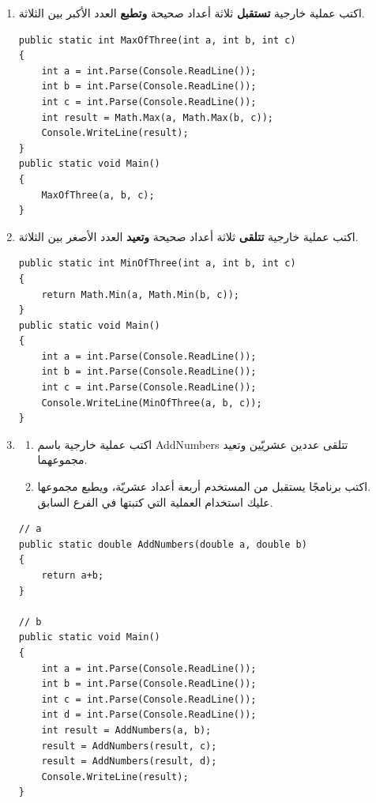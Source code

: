 ﻿\documentclass[12pt]{article}
\begin{document}
\begin{enumerate}[itemsep=3em]
\begin{enumerate}
\item اكتب عملية خارجية \textbf{تستقبل} ثلاثة أعداد صحيحة \textbf{وتطبع} العدد الأكبر بين الثلاثة.
\ifwithsols
\begin{boxSolution}
\begin{english}
\begin{verbatim}
public static int MaxOfThree(int a, int b, int c)
{
    int a = int.Parse(Console.ReadLine());
    int b = int.Parse(Console.ReadLine());
    int c = int.Parse(Console.ReadLine());
    int result = Math.Max(a, Math.Max(b, c));
    Console.WriteLine(result);
}
public static void Main()
{
    MaxOfThree(a, b, c);
}
\end{verbatim}
\end{english}
\end{boxSolution}
\clearpage
\fi


\item اكتب عملية خارجية \textbf{تتلقى} ثلاثة أعداد صحيحة \textbf{وتعيد} العدد الأصغر بين الثلاثة.
\ifwithsols
\begin{boxSolution}
\begin{english}
\begin{verbatim}
public static int MinOfThree(int a, int b, int c)
{
    return Math.Min(a, Math.Min(b, c));
}
public static void Main()
{
    int a = int.Parse(Console.ReadLine());
    int b = int.Parse(Console.ReadLine());
    int c = int.Parse(Console.ReadLine());
    Console.WriteLine(MinOfThree(a, b, c));
}
\end{verbatim}
\end{english}
\end{boxSolution}
\clearpage
\fi

\item
\begin{enumerate}
    \item اكتب عملية خارجية باسم \textenglish{AddNumbers} تتلقى عددين عشريّين وتعيد مجموعهما.
    \item اكتب برنامجًا يستقبل من المستخدم أربعة أعداد عشريّة، ويطبع مجموعها. \\
    عليك استخدام العملية التي كتبتها في الفرع السابق.
\end{enumerate}
\ifwithsols
\begin{boxSolution}
\begin{english}
\begin{verbatim}
// a
public static double AddNumbers(double a, double b)
{
    return a+b;
}

// b
public static void Main()
{
    int a = int.Parse(Console.ReadLine());
    int b = int.Parse(Console.ReadLine());
    int c = int.Parse(Console.ReadLine());
    int d = int.Parse(Console.ReadLine());
    int result = AddNumbers(a, b);
    result = AddNumbers(result, c);
    result = AddNumbers(result, d);
    Console.WriteLine(result);
}
\end{verbatim}
\end{english}
\end{boxSolution}
\fi


\end{enumerate}
\end{enumerate}
\end{document}

